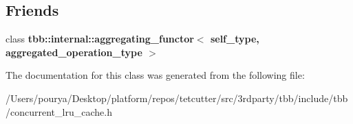 \subsection*{Friends}
\begin{DoxyCompactItemize}
\item 
\hypertarget{classtbb_1_1interface6_1_1concurrent__lru__cache_ab9fb998ff3f90c4dc7cefd09f8ff1365}{}class {\bfseries tbb\+::internal\+::aggregating\+\_\+functor$<$ self\+\_\+type, aggregated\+\_\+operation\+\_\+type $>$}\label{classtbb_1_1interface6_1_1concurrent__lru__cache_ab9fb998ff3f90c4dc7cefd09f8ff1365}

\end{DoxyCompactItemize}


The documentation for this class was generated from the following file\+:\begin{DoxyCompactItemize}
\item 
/\+Users/pourya/\+Desktop/platform/repos/tetcutter/src/3rdparty/tbb/include/tbb/concurrent\+\_\+lru\+\_\+cache.\+h\end{DoxyCompactItemize}
